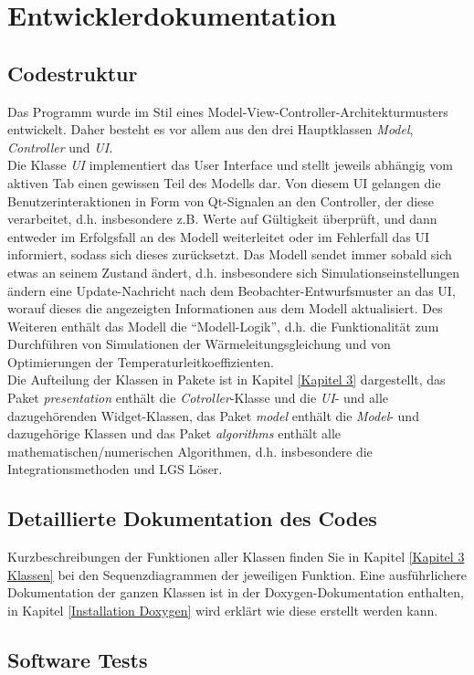\chapter{Entwicklerdokumentation}
\section{Codestruktur}
Das Programm wurde im Stil eines Model-View-Controller-Architekturmusters entwickelt. Daher besteht es vor allem aus den drei Hauptklassen \emph{Model}, \emph{Controller} und \emph{UI}. \\
Die Klasse \emph{UI} implementiert das User Interface und stellt jeweils abhängig vom aktiven Tab einen gewissen Teil des Modells dar. Von diesem UI gelangen die Benutzerinteraktionen in Form von Qt-Signalen an den Controller, der diese verarbeitet, d.h. insbesondere z.B. Werte auf Gültigkeit überprüft, und dann entweder im Erfolgsfall an des Modell weiterleitet oder im Fehlerfall das UI informiert, sodass sich dieses zurücksetzt. Das Modell sendet immer sobald sich etwas an seinem Zustand ändert, d.h. insbesondere sich Simulationseinstellungen ändern eine Update-Nachricht nach dem Beobachter-Entwurfsmuster an das UI, worauf dieses die angezeigten Informationen aus dem Modell aktualisiert. Des Weiteren enthält das Modell die "`Modell-Logik"', d.h. die Funktionalität zum Durchführen von Simulationen der Wärmeleitungsgleichung und von Optimierungen der Temperaturleitkoeffizienten.\\
Die Aufteilung der Klassen in Pakete ist in Kapitel \ref{Kapitel 3} dargestellt, das Paket \emph{presentation} enthält die \emph{Cotroller}-Klasse und die \emph{UI}- und alle dazugehörenden Widget-Klassen, das Paket \emph{model} enthält die \emph{Model}- und dazugehörige Klassen und das Paket \emph{algorithms} enthält alle mathematischen/numerischen Algorithmen, d.h. insbesondere die Integrationsmethoden und LGS Löser.

\section{Detaillierte Dokumentation des Codes}
Kurzbeschreibungen der Funktionen aller Klassen finden Sie in Kapitel \ref{Kapitel 3 Klassen} bei den Sequenzdiagrammen der jeweiligen Funktion. Eine ausführlichere Dokumentation der ganzen Klassen ist in der Doxygen-Dokumentation enthalten, in Kapitel \ref{Installation Doxygen} wird erklärt wie diese erstellt werden kann.

\section{Software Tests}

